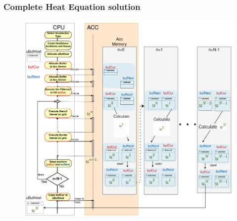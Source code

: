 \documentclass[9pt]{beamer}
\begin{document}
\begin{frame}
\frametitle{Complete Heat Equation solution}
\vspace{-0.73\baselineskip}
\begin{figure}
    \centering
    \includegraphics[width=0.92\linewidth,height=0.90\textheight]{Screenshot from 2024-09-26 15-13-53.png}
\end{figure}
\end{frame}
\end{document}
